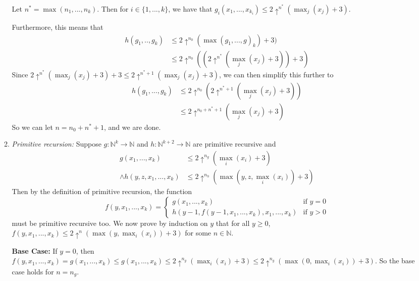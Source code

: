 \documentclass{article}
\newcommand{\nat}{\mathbb{N}}
\begin{document}
\begin{enumerate}
\begin{enumerate}
        Let $n^* = \max(n_1, ..., n_k)$.
        Then for $i \in \{1, ..., k\}$, we have that
        $g_i(x_1, ..., x_{k_i}) \leq 2\uparrow^{n^*}(\max_j(x_j) + 3)$.

        Furthermore, this means that
        \begin{align*}
        h(g_1, .., g_k) 
        &\leq 2\uparrow^{n_0} (\max(g_1, ..., g)_k) + 3)\\
        &\leq 2\uparrow^{n_0} ((2\uparrow^{n^*}(\max_j(x_j) + 3)) + 3)
        \end{align*}
        Since $2\uparrow^{n^*}(\max_j(x_j) + 3) + 3 \leq 2\uparrow^{n^* + 1} (\max_j(x_j) + 3)$, we can then simplify this further to
        \begin{align*}
        h(g_1, ..., g_k) &\leq 2\uparrow^{n_0}(2\uparrow^{n^* + 1} (\max_j(x_j) + 3))\\
            &\leq 2\uparrow^{n_0 + n^* + 1} (\max_j(x_j)+3)
        \end{align*}
        So we can let $n = n_0 + n^* + 1$, and we are done.

        \item \textit{Primitive recursion:} Suppose $g: \nat^k \to \nat$ and $h:\nat^{k+2} \to \nat$ are primitive recursive and
        \begin{align*}
            g(x_1, ..., x_k) &\leq 2\uparrow^{n_g}(\max_i(x_i) + 3)\\
            \land h(y, z, x_1, ..., x_k) &\leq 2 \uparrow^{n_h}(\max(y, z,\max_i(x_i)) + 3)
        \end{align*}
        Then by the definition of primitive recursion, the function 
        $$f(y, x_1, ..., x_k) = \begin{cases}
            g(x_1, ..., x_k)
            & \text{if }y=0
            \\
            h(y-1, f(y-1,x_1,..., x_k), x_1,..., x_k)
            & \text{if }y > 0
        \end{cases}$$
        must be primitive recursive too.
        We now prove by induction on $y$ that for all $y \geq 0$,
        $f(y, x_1, ..., x_k) \leq 2\uparrow^n (\max(y, \max_i(x_i)) + 3)$ for some $n \in \nat$.
        
        \textbf{Base Case:}
        If $y = 0$, then $f(y, x_1, ..., x_k) = g(x_1, ..., x_k) \leq g(x_1, ..., x_k) \leq 2\uparrow^{n_g}(\max_i(x_i) + 3) \leq 2\uparrow^{n_g}(\max(0, \max_i(x_i)) + 3)$.
        So the base case holds for $n = n_g$.


\end{enumerate}
\end{enumerate}
\end{document}
